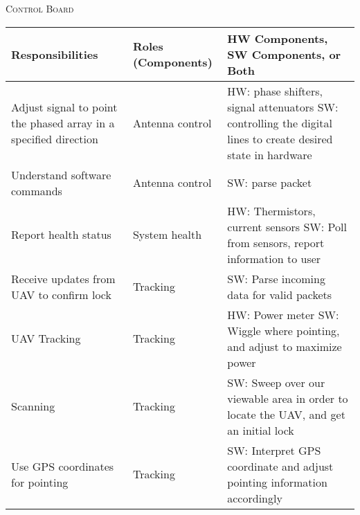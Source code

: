 \documentclass[RRC.tex]{subfiles}
\begin{document}
\bigskip

\begin{center}
	\textsc{\Large Control Board}
	\hrulefill
	\begin{tabular}{ | p{5cm} | p{5cm} | p{5cm} |}
		\hline
		Responsibilities & Roles (Components) & HW Components, SW Components, or Both \\ \hline	
		Adjust signal to point the phased array in a specified direction & Antenna control & HW: phase shifters, signal attenuators SW: controlling the digital lines to create desired state in hardware   \\ \hline
		Understand software commands & Antenna control & SW: parse packet  \\ \hline
		Report health status & System health & HW: Thermistors, current sensors SW: Poll from sensors, report information to user \\ \hline
		Receive updates from UAV to confirm lock & Tracking & SW: Parse incoming data for valid packets \\ \hline
		UAV Tracking & Tracking & HW: Power meter SW: Wiggle where pointing, and adjust to maximize power \\ \hline
		Scanning & Tracking & SW: Sweep over our viewable area in order to locate the UAV, and get an initial lock \\ \hline
		Use GPS coordinates for pointing & Tracking & SW: Interpret GPS coordinate and adjust pointing information accordingly \\ \hline
		
		
		
	\end{tabular}
\end{center}
\end{document}
